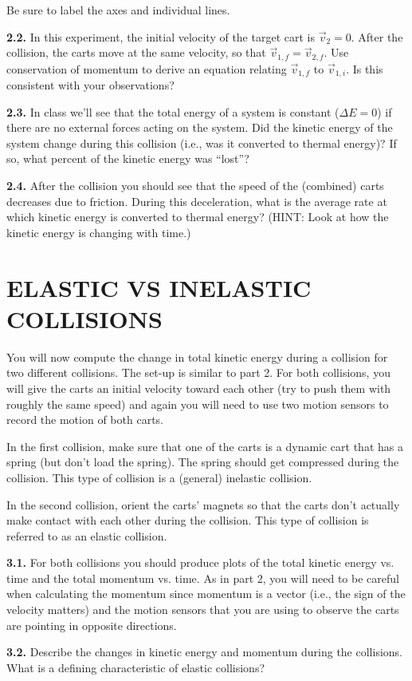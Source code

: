 \documentclass[11pt,letterpaper]{article}
\begin{document}
Be sure to label the axes and individual lines.

\textbf{2.2.} In this experiment, the initial velocity of the target cart is $\vec v_2=0$. After the collision, the carts move at the same velocity, so that $\vec v_{1,f}=\vec v_{2,f}$. Use conservation of momentum to derive an equation relating $\vec v_{1,f}$ to $\vec v_{1,i}$. Is this consistent with your observations?

\textbf{2.3.} In class we'll see that the total energy of a system is constant ($\Delta E=0$) if there are no external forces acting on the system. Did the kinetic energy of the system change during this collision (i.e., was it converted to thermal energy)? If so, what percent of the kinetic energy was ``lost''?

\textbf{2.4.} After the collision you should see that the speed of the (combined) carts decreases due to friction. During this deceleration, what is the average rate at which kinetic energy is converted to thermal energy? (HINT: Look at how the kinetic energy is changing with time.)



\section{ELASTIC VS INELASTIC COLLISIONS}
You will now compute the change in total kinetic energy during a collision for two different collisions.  The set-up is similar to part 2. For both collisions, you will give the carts an initial velocity toward each other (try to push them with roughly the same speed) and again you will need to use two motion sensors to record the motion of both carts. 

In the first collision, make sure that one of the carts is a dynamic cart that has a spring (but don't load the spring). The spring should get compressed during the collision. This type of collision is a (general) inelastic collision. 

In the second collision, orient the carts' magnets so that the carts don't actually make contact with each other during the collision. This type of collision is referred to as an elastic collision.

\textbf{3.1.} For both collisions you should produce plots of the total kinetic energy vs. time and the total momentum vs. time. As in part 2, you will need to be careful when calculating the momentum since momentum is a vector (i.e., the sign of the velocity matters) and the motion sensors that you are using to observe the carts are pointing in opposite directions.

\textbf{3.2.} Describe the changes in kinetic energy and momentum during the collisions. What is a defining characteristic of elastic collisions?
\end{document}
